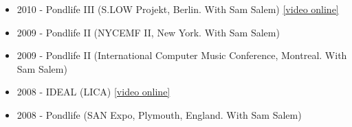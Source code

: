 \begin{itemize}
\item 2010 - Pondlife III (S.LOW Projekt, Berlin. With Sam Salem) {\href{http://vimeo.com/14878086}{[video online]}}
\item 2009 - Pondlife II (NYCEMF II, New York. With Sam Salem)
\item 2009 - Pondlife II (International Computer Music Conference, Montreal. With Sam Salem)
\item 2008 - IDEAL (LICA) {\href{http://vimeo.com/5741743}{[video online]}}
\item 2008 - Pondlife (SAN Expo, Plymouth, England. With Sam Salem)
\end{itemize}
